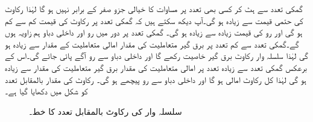گمکی تعدد سے ہٹ کر کسی بھی تعدد پر مساوات  کا خیالی جزو صفر کے برابر نہیں ہو گا لہٰذا رکاوٹ کی حتمی قیمت  سے زیادہ ہو گی۔آپ دیکھ سکتے ہیں کہ گمکی تعدد پر رکاوٹ کی قیمت کم سے کم ہو گی اور رو کی قیمت زیادہ سے زیادہ ہو گی۔ گمکی تعدد پر دور میں رو اور داخلی دباو ہم زاویہ ہوں گے۔گمکی تعدد سے کم تعدد پر برق گیر متعاملیت کی مقدار امالی متعاملیت کے مقدار سے زیادہ ہو گی لہٰذا سلسلہ وار رکاوٹ برق گیر خاصیت رکھے گا اور داخلی دباو سے رو آگے پائی جائے گی۔اس کے برعکس گمکی تعدد سے زیادہ تعدد پر امالی متعاملیت کی مقدار برق گیر متعاملیت کی مقدار سے زیادہ ہو گی لہٰذا کل رکاوٹ امالی ہو گا اور داخلی دباو سے رو پیچھے ہو گی۔ رکاوٹ کی مقدار بالمقابل تعدد کو شکل  میں دکھایا گیا ہے۔
\begin{figure}
\centering
{}
\caption{سلسلہ وار  کی رکاوٹ بالمقابل تعدد کا خط۔}
\label{شکل_تعددی_رکاوٹ_بالمقابل_تعدد_سلسلہ_وار_دور}
\end{figure}


